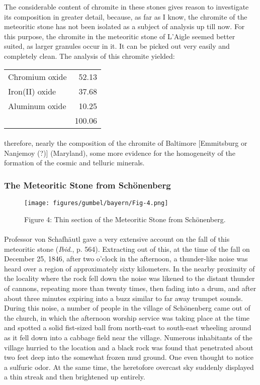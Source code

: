 \documentclass[a4paper, 12pt, oneside]{article}
\begin{document}
The considerable content of chromite in these stones gives reason to investigate its composition in greater detail, because, as far as I know, the chromite of the meteoritic stone has not been isolated as a subject of analysis up till now. For this purpose, the chromite in the meteoritic stone of L'Aigle seemed better suited, as larger granules occur in it. It can be picked out very easily and completely clean. The analysis of this chromite yielded:
\begin{center}
    \begin{tabular}{l r}
        Chromium oxide & 52.13\\
        Iron(II) oxide & 37.68\\
        Aluminum oxide & 10.25\\
         & 100.06\\
    \end{tabular}
\end{center}
\paragraph*{}
therefore, nearly the composition of the chromite of Baltimore [Emmitsburg or Nanjemoy (?)] (Maryland), some more evidence for the homogeneity of the formation of the cosmic and telluric minerals.
\clearpage
\subsubsection{The Meteoritic Stone from Schönenberg}
\begin{figure}[h]
\centering
\texttt{[image: figures/gumbel/bayern/Fig-4.png]}
\caption{Figure 4: Thin section of the Meteoritic Stone from Schönenberg.}
\end{figure}
\paragraph*{}
Professor von Schafhäutl gave a very extensive account on the fall of this meteoritic stone (\emph{Ibid}., p. 564). Extracting out of this, at the time of the fall on December 25, 1846, after two o'clock in the afternoon, a thunder-like noise was heard over a region of approximately sixty kilometers. In the nearby proximity of the locality where the rock fell down the noise was likened to the distant thunder of cannons, repeating more than twenty times, then fading into a drum, and after about three minutes expiring into a buzz similar to far away trumpet sounds. During this noise, a number of people in the village of Schönenberg came out of the church, in which the afternoon worship service was taking place at the time and spotted a solid fist-sized ball from north-east to south-east wheeling around as it fell down into a cabbage field near the village. Numerous inhabitants of the village hurried to the location and a black rock was found that penetrated about two feet deep into the somewhat frozen mud ground. One even thought to notice a sulfuric odor. At the same time, the heretofore overcast sky suddenly displayed a thin streak and then brightened up entirely.
\end{document}
